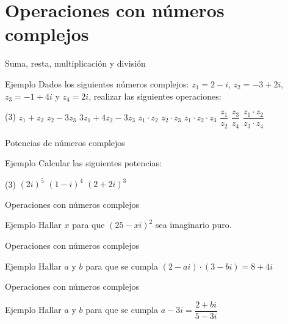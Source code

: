 \documentclass[8pt]{beamer}
\begin{document}
\section{Operaciones con números complejos}
\begin{frame}[t]{Suma, resta, multiplicación y división}
\begin{exampleblock}{Ejemplo}
Dados los siguientes números complejos: $z_1= 2-i $, $z_ 2= -3+2i$, $z_3= -1+4i$ y $z_4=2i$, realizar las siguientes operaciones:
\begin{tasks}[label=\alph*)](3)
\task $z_1+z_2$
\task $z_2-3z_3$
\task $3z_1+4z_2- 3z_3$
\task $z_1\cdot z_2$
\task $z_2\cdot z_3$
\task $z_1\cdot z_2 \cdot z_3$
\task $\dfrac{z_1}{z_2}$
\task $\dfrac{z_3}{z_4}$
\task $ \dfrac{z_1 \cdot z_2}{z_3 \cdot z_4}$
\end{tasks}
\end{exampleblock}
\end{frame}

\begin{frame}[t]{Potencias de números complejos}
\begin{exampleblock}{Ejemplo}
Calcular las siguientes potencias:
\begin{tasks}[label=\alph*)](3)
\task $(2i)^5$
\task $(1-i)^4$
\task $(2+2i)^3$
\end{tasks}
\end{exampleblock}
\end{frame}

\begin{frame}[t]{Operaciones con números complejos}
\begin{exampleblock}{Ejemplo}
Hallar $x$ para que $(25-xi)^2$ sea imaginario puro.
\end{exampleblock}
\end{frame}

\begin{frame}[t]{Operaciones con números complejos}
\begin{exampleblock}{Ejemplo}
Hallar $a$ y $b$ para que se cumpla $(2-ai)\cdot(3-bi)=8+4i$
\end{exampleblock}

\end{frame}

\begin{frame}[t]{Operaciones con números complejos}
\begin{exampleblock}{Ejemplo}
Hallar $a$ y $b$ para que se cumpla $a-3i= \dfrac{2+bi}{5-3i}$
\end{exampleblock}

\end{frame}
\end{document}
